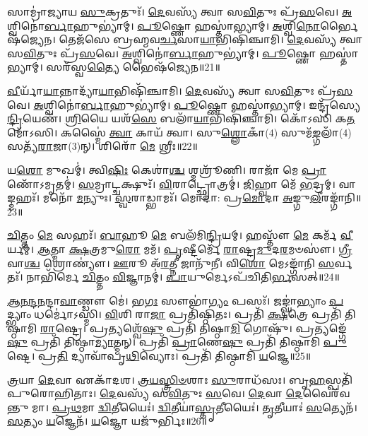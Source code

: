 𑌸𑌾𑌮𑍍𑌰𑌾॑𑌜𑍍𑌯𑌾𑌯 \ul{𑌸𑍁}\-𑌕𑍍𑌰𑌤𑍁𑌃᳴।
\-\ul{𑌦𑍇}\-𑌵𑌸𑍍𑌯᳴ 𑌤𑍍𑌵𑌾 𑌸\-\ul{𑌵𑌿}\-𑌤𑍁𑌃 𑌪𑍍𑌰᳴\-\ul{𑌸}\-𑌵𑍇।
\-\ul{𑌅}\-𑌶𑍍𑌵𑌿𑌨𑍋॑\-\ul{𑌰𑍍𑌬𑌾}\-𑌹𑍁𑌭𑍍𑌯𑌾॑𑌮𑍍।
\-\ul{𑌪𑍂}\-𑌷𑍍𑌣𑍋 𑌹𑌸𑍍𑌤𑌾॑𑌭𑍍𑌯𑌾𑌮𑍍।
\-\ul{𑌅}\-𑌶𑍍𑌵𑌿\-\ul{𑌨𑍋}\-𑌰𑍍𑌭𑍈𑌷᳴𑌜𑍍𑌯𑍇𑌨।
𑌤𑍇𑌜᳴𑌸𑍇 𑌬𑍍𑌰𑌹𑍍𑌮𑌵\-\ul{𑌰𑍍𑌚}\-𑌸𑌾\-\ul{𑌯𑌾}\-𑌭𑌿𑌷𑌿᳴𑌞𑍍𑌚𑌾𑌮𑌿।
\-\ul{𑌦𑍇}\-𑌵𑌸𑍍𑌯᳴ 𑌤𑍍𑌵𑌾 𑌸\-\ul{𑌵𑌿}\-𑌤𑍁𑌃 𑌪𑍍𑌰᳴\-\ul{𑌸}\-𑌵𑍇।
\-\ul{𑌅}\-𑌶𑍍𑌵𑌿𑌨𑍋॑\-\ul{𑌰𑍍𑌬𑌾}\-𑌹𑍁𑌭𑍍𑌯𑌾॑𑌮𑍍।
\-\ul{𑌪𑍂}\-𑌷𑍍𑌣𑍋 𑌹𑌸𑍍𑌤𑌾॑𑌭𑍍𑌯𑌾𑌮𑍍।
𑌸𑌰᳴𑌸𑍍𑌵\-\ul{𑌤𑍍𑌯𑍈} 𑌭𑍈𑌷᳴𑌜𑍍𑌯𑍇𑌨॥21॥

\-\ul{𑌵𑍀}\-𑌰𑍍𑌯𑌾᳴\-\ul{𑌯𑌾}\-𑌨𑍍𑌨𑌾𑌦𑍍𑌯𑌾᳴\-\ul{𑌯𑌾}\-𑌭𑌿𑌷𑌿᳴𑌞𑍍𑌚𑌾𑌮𑌿।
\-\ul{𑌦𑍇}\-𑌵𑌸𑍍𑌯᳴ 𑌤𑍍𑌵𑌾 𑌸\-\ul{𑌵𑌿}\-𑌤𑍁𑌃 𑌪𑍍𑌰᳴\-\ul{𑌸}\-𑌵𑍇।
\-\ul{𑌅}\-𑌶𑍍𑌵𑌿𑌨𑍋॑\-\ul{𑌰𑍍𑌬𑌾}\-𑌹𑍁𑌭𑍍𑌯𑌾॑𑌮𑍍।
\-\ul{𑌪𑍂}\-𑌷𑍍𑌣𑍋 𑌹𑌸𑍍𑌤𑌾॑𑌭𑍍𑌯𑌾𑌮𑍍।
𑌇𑌨𑍍𑌦𑍍𑌰᳴𑌸𑍍𑌯𑍇\-\ul{𑌨𑍍𑌦𑍍𑌰𑌿}\-𑌯𑍇𑌣᳴।
\-\ul{𑌶𑍍𑌰𑌿}\-𑌯𑍈 𑌯𑌶᳴\-\ul{𑌸𑍇} 𑌬𑌲𑌾᳴\-\ul{𑌯𑌾}\-𑌭𑌿𑌷𑌿᳴𑌞𑍍𑌚𑌾𑌮𑌿।
𑌕𑍋᳴𑌽𑌸𑌿 𑌕\-\ul{𑌤}\-𑌮𑍋᳴𑌽𑌸𑌿।
𑌕𑌸𑍍𑌮𑍈॑ \ul{𑌤𑍍𑌵𑌾} 𑌕𑌾𑌯᳴ 𑌤𑍍𑌵𑌾।
𑌸𑍁\-\ul{𑌶𑍍𑌲𑍋}\-𑌕𑌾𑌁(4) 𑌸𑍁𑌮᳴\-\ul{𑌙𑍍𑌗}\-𑌲𑌾𑌁(4) 𑌸𑌤𑍍𑌯᳴\-\ul{𑌰𑌾}\-𑌜𑌾(3)𑌨𑍍।
𑌶𑌿𑌰𑍋᳴ \ul{𑌮𑍇} 𑌶𑍍𑌰𑍀𑌃॥22॥

𑌯\-\ul{𑌶𑍋} 𑌮𑍁𑌖𑌮𑍍॑।
𑌤𑍍𑌵𑌿\-\ul{𑌷𑌿𑌃} 𑌕𑍇𑌶𑌾॑\-\ul{𑌶𑍍𑌚} 𑌶𑍍𑌮𑌶𑍍𑌰𑍂᳴𑌣𑌿।
𑌰𑌾𑌜𑌾᳴ 𑌮𑍇 \ul{𑌪𑍍𑌰𑌾}\-𑌣𑍋᳴\-𑌽𑌮𑍃𑌤𑌮𑍍॑।
\-\ul{𑌸}\-𑌮𑍍𑌰𑌾𑌟𑍍𑌚𑌕𑍍𑌷𑍁𑌃᳴।
\-\ul{𑌵𑌿}\-𑌰𑌾𑌟𑍍𑌛𑍍𑌰𑍋𑌤𑍍𑌰𑌮𑍍॑।
\-\ul{𑌜𑌿}\-𑌹𑍍𑌵𑌾 𑌮𑍇᳴ \ul{𑌭}\-𑌦𑍍𑌰𑌮𑍍।
𑌵𑌾𑌙𑍍𑌮𑌹𑌃᳴।
𑌮𑌨𑍋᳴ \ul{𑌮}\-𑌨𑍍𑌯𑍁𑌃।
\-\ul{𑌸𑍍𑌵}\-𑌰𑌾𑌡𑍍𑌭𑌾𑌮𑌃᳴।
𑌮𑍋𑌦𑌾॑: 𑌪𑍍𑌰\-\ul{𑌮𑍋}\-𑌦𑌾 \ul{𑌅}\-𑌙𑍍𑌗𑍁\-\ul{𑌲𑍀}\-𑌰𑌙𑍍𑌗𑌾᳴𑌨𑌿॥23॥

\-\ul{𑌚𑌿}\-𑌤𑍍𑌤𑌂 \ul{𑌮𑍇} 𑌸𑌹𑌃᳴।
\-\ul{𑌬𑌾}\-𑌹𑍂 \ul{𑌮𑍇} 𑌬𑌲᳴𑌮𑌿\-\ul{𑌨𑍍𑌦𑍍𑌰𑌿}\-𑌯𑌮𑍍।
𑌹𑌸𑍍𑌤𑍗᳴ \ul{𑌮𑍇} 𑌕𑌰𑍍𑌮᳴ \ul{𑌵𑍀}\-𑌰𑍍𑌯𑌮𑍍॑।
\-\ul{𑌆}\-𑌤𑍍𑌮𑌾 \ul{𑌕𑍍𑌷}\-𑌤𑍍𑌰𑌮𑍁\-\ul{𑌰𑍋} 𑌮𑌮᳴।
\-\ul{𑌪𑍃}\-𑌷𑍍𑌟𑍀𑌰𑍍𑌮𑍇᳴ \ul{𑌰𑌾}\-𑌷𑍍𑌟𑍍𑌰\-\ul{𑌮𑍁}\-𑌦\-\ul{𑌰}\-𑌮𑍞𑌸𑍗॑।
\-\ul{𑌗𑍍𑌰𑍀}\-𑌵𑌾\-\ul{𑌶𑍍𑌚} 𑌶𑍍𑌰𑍋𑌣𑍍𑌯𑍗॑।
\-\ul{𑌊}\-𑌰𑍂 𑌅᳴\-\ul{𑌰}\-𑌤𑍍𑌨𑍀 𑌜𑌾𑌨𑍁᳴𑌨𑍀।
𑌵𑌿\-\ul{𑌶𑍋} 𑌮𑍇𑌽𑌙𑍍𑌗𑌾᳴𑌨𑌿 \ul{𑌸}\-𑌰𑍍𑌵𑌤𑌃᳴।
𑌨𑌾𑌭𑌿᳴𑌰𑍍𑌮𑍇 \ul{𑌚𑌿}\-𑌤𑍍𑌤𑌂 \ul{𑌵𑌿}\-𑌜𑍍𑌞𑌾𑌨𑌮𑍍॑।
\-\ul{𑌪𑌾}\-𑌯𑍁𑌰𑍍𑌮𑍇\-𑌽𑌪᳴𑌚𑌿𑌤𑌿\-\ul{𑌰𑍍𑌭}\-𑌸𑌤𑍍॥24॥

\-\ul{𑌆}\-\-\ul{𑌨}\-\-\ul{𑌨𑍍𑌦}\-\-\ul{𑌨}\-𑌨𑍍𑌦𑌾\-\ul{𑌵𑌾}\-𑌣𑍍𑌡𑍗 𑌮𑍇॑।
𑌭\-\ul{𑌗𑌃} 𑌸𑍗𑌭𑌾॑\-\ul{𑌗𑍍𑌯𑌂} 𑌪𑌸𑌃᳴।
𑌜𑌙𑍍𑌘𑌾॑𑌭𑍍𑌯𑌾𑌂 \ul{𑌪}\-𑌦𑍍𑌭𑍍𑌯𑌾𑌂 𑌧𑌰𑍍𑌮𑍋॑\-𑌽𑌸𑍍𑌮𑌿।
\-\ul{𑌵𑌿}\-𑌶𑌿 𑌰𑌾\-\ul{𑌜𑌾} 𑌪𑍍𑌰𑌤𑌿᳴\-𑌷𑍍𑌠𑌿𑌤𑌃।
𑌪𑍍𑌰𑌤𑌿᳴ \ul{𑌕𑍍𑌷}\-𑌤𑍍𑌰𑍇 𑌪𑍍𑌰𑌤𑌿᳴ 𑌤𑌿𑌷𑍍𑌠𑌾𑌮𑌿 \ul{𑌰𑌾}\-𑌷𑍍𑌟𑍍𑌰𑍇।
𑌪𑍍𑌰𑌤𑍍𑌯𑌶𑍍𑌵𑍇᳴\-\ul{𑌷𑍁} 𑌪𑍍𑌰𑌤𑌿᳴ 𑌤𑌿𑌷𑍍𑌠𑌾\-\ul{𑌮𑌿} 𑌗𑍋𑌷𑍁᳴।
𑌪𑍍𑌰𑌤𑍍𑌯𑌙𑍍𑌗𑍇᳴\-\ul{𑌷𑍁} 𑌪𑍍𑌰𑌤𑌿᳴ 𑌤𑌿𑌷𑍍𑌠𑌾\-\ul{𑌮𑍍𑌯𑌾}\-𑌤𑍍𑌮𑌨𑍍।
𑌪𑍍𑌰𑌤𑌿᳴ \ul{𑌪𑍍𑌰𑌾}\-𑌣𑍇\-\ul{𑌷𑍁} 𑌪𑍍𑌰𑌤𑌿᳴ 𑌤𑌿𑌷𑍍𑌠𑌾𑌮𑌿 \ul{𑌪𑍁}\-𑌷𑍍𑌟𑍇।
𑌪𑍍𑌰\-\ul{𑌤𑌿} 𑌦𑍍𑌯𑌾𑌵𑌾᳴𑌪𑍃\-\ul{𑌥𑌿}\-𑌵𑍍𑌯𑍋𑌃।
𑌪𑍍𑌰𑌤𑌿᳴ 𑌤𑌿𑌷𑍍𑌠𑌾𑌮𑌿 \ul{𑌯}\-𑌜𑍍𑌞𑍇॥25॥

\-\ul{𑌤𑍍𑌰}\-𑌯𑌾 \ul{𑌦𑍇}\-𑌵𑌾 𑌏𑌕𑌾᳴𑌦𑌶।
\-\ul{𑌤𑍍𑌰}\-\-\ul{𑌯}\-\-\ul{𑌸𑍍𑌤𑍍𑌰𑌿}\-\-\ul{𑍞}\-𑌶𑌾𑌃 \ul{𑌸𑍁}\-𑌰𑌾𑌧᳴𑌸𑌃।
𑌬𑍃\-\ul{𑌹}\-𑌸𑍍𑌪𑌤𑌿᳴𑌪𑍁𑌰𑍋\-𑌹𑌿𑌤𑌾𑌃।
\-\ul{𑌦𑍇}\-𑌵𑌸𑍍𑌯᳴ 𑌸\-\ul{𑌵𑌿}\-𑌤𑍁𑌃 \ul{𑌸}\-𑌵𑍇।
\-\ul{𑌦𑍇}\-𑌵𑌾 \ul{𑌦𑍇}\-𑌵𑍈𑌰᳴𑌵𑌨𑍍𑌤𑍁 𑌮𑌾।
\-\ul{𑌪𑍍𑌰}\-\-\ul{𑌥}\-𑌮𑌾 \ul{𑌦𑍍𑌵𑌿}\-𑌤𑍀𑌯𑍈𑌃॑।
\-\ul{𑌦𑍍𑌵𑌿}\-𑌤𑍀𑌯𑌾॑\-\ul{𑌸𑍍𑌤𑍃}\-𑌤𑍀𑌯𑍈𑌃॑।
\-\ul{𑌤𑍃}\-𑌤𑍀𑌯𑌾𑌃॑ \ul{𑌸}\-𑌤𑍍𑌯𑍇𑌨᳴।
\-\ul{𑌸}\-𑌤𑍍𑌯𑌂 \ul{𑌯}\-𑌜𑍍𑌞𑍇𑌨᳴।
\-\ul{𑌯}\-𑌜𑍍𑌞𑍋 𑌯𑌜𑍁᳴𑌰𑍍𑌭𑌿𑌃॥26॥

